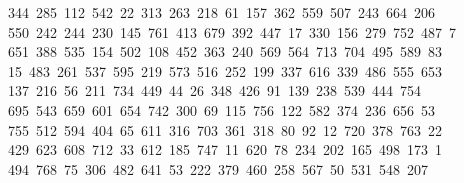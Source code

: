 \begin{tabbing}
\ 344\ 285\ 112\ 542\ 22\ 313\ 263\ 218\ 61\ 157\ 362\ 559\ 507\ 243\ 664\ 206\\[0pt]
\>\ 550\ 242\ 244\ 230\ 145\ 761\ 413\ 679\ 392\ 447\ 17\ 330\ 156\ 279\ 752\ 487\ 7\\[0pt]
\ 651\ 388\ 535\ 154\ 502\ 108\ 452\ 363\ 240\ 569\ 564\ 713\ 704\ 495\ 589\ 83\\[0pt]
\>\ 15\ 483\ 261\ 537\ 595\ 219\ 573\ 516\ 252\ 199\ 337\ 616\ 339\ 486\ 555\ 653\ \\[0pt]
\ 137\ 216\ 56\ 211\ 734\ 449\ 44\ 26\ 348\ 426\ 91\ 139\ 238\ 539\ 444\ 754\ \\[0pt]
\ 695\ 543\ 659\ 601\ 654\ 742\ 300\ 69\ 115\ 756\ 122\ 582\ 374\ 236\ 656\ 53\\[0pt]
\ 755\ 512\ 594\ 404\ 65\ 611\ 316\ 703\ 361\ 318\ 80\ 92\ 12\ 720\ 378\ 763\ 22\\[0pt]
\ 429\ 623\ 608\ 712\ 33\ 612\ 185\ 747\ 11\ 620\ 78\ 234\ 202\ 165\ 498\ 173\ 1\\[0pt]
\ 494\ 768\ 75\ 306\ 482\ 641\ 53\ 222\ 379\ 460\ 258\ 567\ 50\ 531\ 548\ 207\ \\[0pt]

\end{tabbing}
